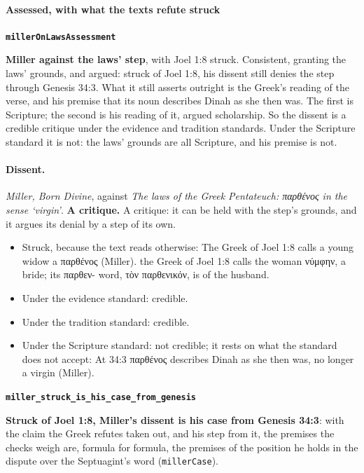 \documentclass[11pt]{article}
\begin{document}
\paragraph*{Assessed, with what the texts refute struck}
\leavevmode\par\nobreak
\par\medskip\noindent\textbf{\texttt{miller\allowbreak{}On\allowbreak{}Laws\allowbreak{}Assessment}}\par\nobreak\noindent
\textbf{Miller against the laws’ step}, with Joel 1:8 struck. Consistent, granting the laws’ grounds, and argued: struck of Joel 1:8, his dissent still denies the step through Genesis 34:3. What it still asserts outright is the Greek’s reading of the verse, and his premise that its noun describes Dinah as she then was. The first is Scripture; the second is his reading of it, argued scholarship. So the dissent is a credible critique under the evidence and tradition standards. Under the Scripture standard it is not: the laws’ grounds are all Scripture, and his premise is not.

\paragraph{Dissent.} \emph{Miller, Born Divine}, against \emph{The laws of the Greek Pentateuch: παρθένος in the sense ‘virgin’}. \textbf{A critique.} A critique: it can be held with the step’s grounds, and it argues its denial by a step of its own.
\begin{itemize}
\item Struck, because the text reads otherwise: The Greek of Joel 1:8 calls a young widow a παρθένος (Miller). the Greek of Joel 1:8 calls the woman νύμφην, a bride; its παρθεν- word, τὸν παρθενικόν, is of the husband.
\item Under the evidence standard: credible.
\item Under the tradition standard: credible.
\item Under the Scripture standard: not credible; it rests on what the standard does not accept: At 34:3 παρθένος describes Dinah as she then was, no longer a virgin (Miller).
\end{itemize}
\par\medskip\noindent\textbf{\texttt{miller\_\allowbreak{}struck\_\allowbreak{}is\_\allowbreak{}his\_\allowbreak{}case\_\allowbreak{}from\_\allowbreak{}genesis}}\par\nobreak\noindent
\textbf{Struck of Joel 1:8, Miller’s dissent is his case from Genesis 34:3}: with the claim the Greek refutes taken out, and his step from it, the premises the checks weigh are, formula for formula, the premises of the position he holds in the dispute over the Septuagint’s word (\texttt{miller\allowbreak{}Case}).
\end{document}

